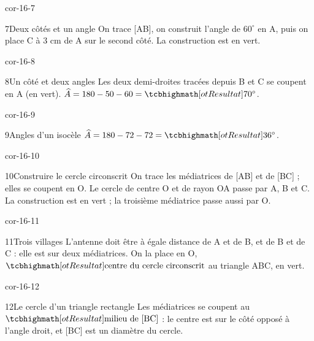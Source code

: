 \begin{blocLivre}{cor-16-7}\begin{corrige}{7}{Deux côtés et un angle}
On trace [AB], on construit l’angle de $60^\circ$ en A, puis on place C à 3 cm de A sur le second côté. La construction est en vert.
\label{fig-cor-16-7}
\end{corrige}\end{blocLivre}
\begin{blocLivre}{cor-16-8}\begin{corrige}{8}{Un côté et deux angles}
Les deux demi-droites tracées depuis B et C se coupent en A (en vert). $\widehat{A}=180-50-60=\res{70^\circ}$.
\label{fig-cor-16-8}
\end{corrige}\end{blocLivre}
\begin{blocLivre}{cor-16-9}\begin{corrige}{9}{Angles d’un isocèle}
$\widehat{A}=180-72-72=\res{36^\circ}$.
\label{fig-cor-16-9}
\end{corrige}\end{blocLivre}
\begin{blocLivre}{cor-16-10}\begin{corrige}{10}{Construire le cercle circonscrit}
On trace les médiatrices de [AB] et de [BC] ; elles se coupent en O. Le cercle de centre O et de rayon OA passe par A, B et C. La construction est en vert ; la troisième médiatrice passe aussi par O.
\label{fig-cor-16-10}
\end{corrige}\end{blocLivre}
\begin{blocLivre}{cor-16-11}\begin{corrige}{11}{Trois villages}
L’antenne doit être à égale distance de A et de B, et de B et de C : elle est sur deux médiatrices. On la place en O, $\res{\text{centre du cercle circonscrit}}$ au triangle ABC, en vert.
\label{fig-cor-16-11}
\end{corrige}\end{blocLivre}
\begin{blocLivre}{cor-16-12}\begin{corrige}{12}{Le cercle d’un triangle rectangle}
Les médiatrices se coupent au $\res{\text{milieu de [BC]}}$ : le centre est sur le côté opposé à l’angle droit, et [BC] est un diamètre du cercle.
\label{fig-cor-16-12}
\end{corrige}\end{blocLivre}

